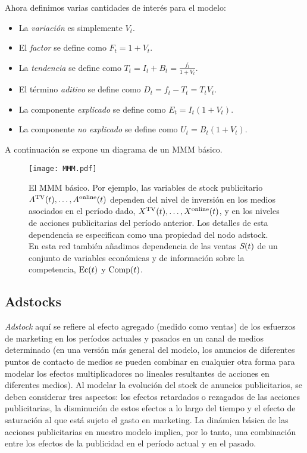 Ahora definimos varias cantidades de interés para el modelo:
\begin{itemize}
	\item La \emph{variación} es simplemente \(V_t\).
	\item El \emph{factor} se define como \(F_t = 1+V_t\).
	\item La \emph{tendencia} se define como \(T_t = I_t + B_t = \frac{f_t}{1+V_t}\).
	\item El término \emph{aditivo} se define como \(D_t = f_t - T_t = T_t V_t\).
	\item La componente \emph{explicado} se define como \(E_t = I_t (1 + V_t)\).
	\item La componente \emph{no explicado} se define como \(U_t = B_t (1 + V_t)\).
\end{itemize}

A continuación se expone un diagrama de un MMM básico.
\begin{figure}[h]
	\centering
	\texttt{[image: MMM.pdf]}
	\caption{El MMM básico. Por ejemplo, las variables de stock publicitario $A^{\rm TV}(t),\dotsc,A^{\rm online}(t)$ dependen del nivel de inversión en los medios asociados en el período dado, $X^ {\rm TV}(t),\dotsc,X^{\rm online}(t)$, y en los niveles de acciones publicitarias del período anterior. Los detalles de esta dependencia se especifican como una propiedad del nodo adstock. En esta red también añadimos dependencia de las ventas $S\hspace{-0.15ex}(t)$ de un conjunto de variables económicas y de información sobre la competencia, ${\rm Ec}(t)$ y ${\rm Comp}(t)$.}\label{MMM-DBN}
\end{figure}

\subsection{Adstocks}
\label{subsec:adstocks}

\textit{Adstock} aquí se refiere al efecto agregado (medido como ventas) de los esfuerzos de marketing en los períodos actuales y pasados en un canal de medios determinado (en una versión más general del modelo, los anuncios de diferentes puntos de contacto de medios se pueden combinar en cualquier otra forma para modelar los efectos multiplicadores no lineales resultantes de acciones en diferentes medios). Al modelar la evolución del stock de anuncios publicitarios, se deben considerar tres aspectos: los efectos retardados o rezagados de las acciones publicitarias, la disminución de estos efectos a lo largo del tiempo y el efecto de saturación al que está sujeto el gasto en marketing. La dinámica básica de las acciones publicitarias en nuestro modelo implica, por lo tanto, una combinación entre los efectos de la publicidad en el período actual y en el pasado.


